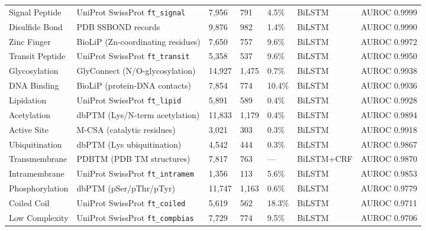 \documentclass[11pt,a4paper]{article}
\begin{document}
\begin{longtable}{L{2.9cm} L{5.2cm} R{1.3cm} R{1.1cm} R{1.2cm} L{1.6cm} R{1.5cm}}
Signal Peptide      & UniProt SwissProt \texttt{ft\_signal}        &  7,956 &   791 & 4.5\%  & BiLSTM      & AUROC 0.9999 \\
Disulfide Bond      & PDB SSBOND records                           &  9,876 &   982 & 1.4\%  & BiLSTM      & AUROC 0.9990 \\
Zinc Finger         & BioLiP (Zn-coordinating residues)            &  7,650 &   757 & 9.6\%  & BiLSTM      & AUROC 0.9972 \\
Transit Peptide     & UniProt SwissProt \texttt{ft\_transit}        &  5,358 &   537 & 9.6\%  & BiLSTM      & AUROC 0.9950 \\
Glycosylation       & GlyConnect (N/O-glycosylation)               & 14,927 & 1,475 & 0.7\%  & BiLSTM      & AUROC 0.9938 \\
DNA Binding         & BioLiP (protein-DNA contacts)                &  7,854 &   774 & 10.4\% & BiLSTM      & AUROC 0.9936 \\
Lipidation          & UniProt SwissProt \texttt{ft\_lipid}          &  5,891 &   589 & 0.4\%  & BiLSTM      & AUROC 0.9928 \\
Acetylation         & dbPTM (Lys/N-term acetylation)               & 11,833 & 1,179 & 0.4\%  & BiLSTM      & AUROC 0.9894 \\
Active Site         & M-CSA (catalytic residues)                   &  3,021 &   303 & 0.3\%  & BiLSTM      & AUROC 0.9918 \\
Ubiquitination      & dbPTM (Lys ubiquitination)                   &  4,542 &   444 & 0.3\%  & BiLSTM      & AUROC 0.9867 \\
Transmembrane       & PDBTM (PDB TM structures)                    &  7,817 &   763 & ---    & BiLSTM+CRF  & AUROC 0.9870 \\
Intramembrane       & UniProt SwissProt \texttt{ft\_intramem}       &  1,356 &   113 & 5.6\%  & BiLSTM      & AUROC 0.9853 \\
Phosphorylation     & dbPTM (pSer/pThr/pTyr)                       & 11,747 & 1,163 & 0.6\%  & BiLSTM      & AUROC 0.9779 \\
Coiled Coil         & UniProt SwissProt \texttt{ft\_coiled}         &  5,619 &   562 & 18.3\% & BiLSTM      & AUROC 0.9711 \\
Low Complexity      & UniProt SwissProt \texttt{ft\_compbias}       &  7,729 &   774 & 9.5\%  & BiLSTM      & AUROC 0.9706 \\

\end{longtable}
\end{document}
